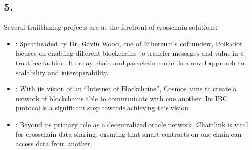 \documentclass[letterpaper,10pt,english]{jupyterBook}
\begin{document}
\subsection{5. }
\label{\detokenize{Interoperability/Cross-Chain Interoperability:leading-innovators-in-interoperability}}
\sphinxAtStartPar
Several trailblazing projects are at the forefront of cross\sphinxhyphen{}chain solutions:
\begin{itemize}
\item {} 
\sphinxAtStartPar
{}: Spearheaded by Dr. Gavin Wood, one of Ethereum’s co\sphinxhyphen{}founders, Polkadot focuses on enabling different blockchains to transfer messages and value in a trust\sphinxhyphen{}free fashion. Its relay chain and parachain model is a novel approach to scalability and interoperability.

\item {} 
\sphinxAtStartPar
{}: With its vision of an “Internet of Blockchains”, Cosmos aims to create a network of blockchains able to communicate with one another. Its IBC protocol is a significant step towards achieving this vision.

\item {} 
\sphinxAtStartPar
{}: Beyond its primary role as a decentralized oracle network, Chainlink is vital for cross\sphinxhyphen{}chain data sharing, ensuring that smart contracts on one chain can access data from another.

\end{itemize}
\end{document}
